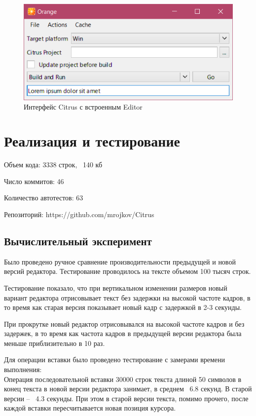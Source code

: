 \documentclass{fefu}
\begin{document}
			\begin{figure}[H]
				\centering
				\includegraphics[width=1\linewidth]{images/EditBox.png}
				\caption{Интерфейс Citrus с встроенным Editor}
			\end{figure}
	\section{Реализация и тестирование}
		\par Объем кода: 3338 строк, ~140 кб
		\par Число коммитов: 46
		\par Количество автотестов: 63
		\par Репозиторий: https://github.com/mrojkov/Citrus
		\subsection{Вычислительный эксперимент}
			\par Было проведено ручное сравнение производительности предыдущей и новой версий 
			редактора. Тестирование проводилось на тексте объемом 100 тысяч строк.
			\par Тестирование показало, что при вертикальном изменении размеров новый вариант 
			редактора отрисовывает текст без задержки на высокой частоте кадров, в то время как
			старая версия показывает новый кадр с задержкой в 2-3 секунды.
			\par При прокрутке новый редактор отрисовывался на высокой частоте кадров и без 
			задержек, в то время как частота кадров в предыдущей версии редактора была меньше
			приблизительно в 10 раз.
			\par Для операции вставки было проведено тестирование с замерами времени 
			выполнения:\\
			Операция последовательной вставки 30000 строк текста длиной 50 символов в конец
			текста в новой версии редактора занимает, в среднем ~6.8 секунд. В старой 
			версии -- ~4.3 секунды. При этом в старой версии текста, помимо прочего, после 
			каждой вставки пересчитывается новая позиция курсора.
\end{document}
